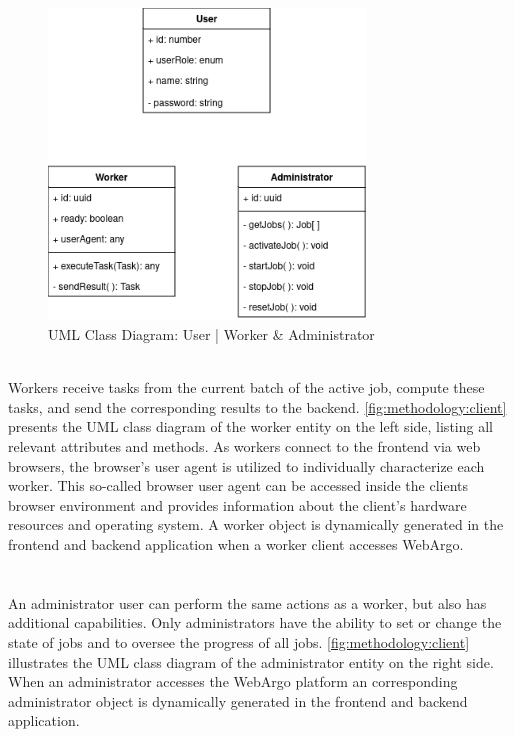 \begin{figure}[htbp]
    \centering
    \includegraphics[width=0.75\textwidth]{gfx/figures/Client.png}
    \caption{\acs{UML} Class Diagram: User | Worker \& Administrator}
    \label{fig:methodology:client}
\end{figure}
~\\
Workers receive tasks from the current batch of the active job, compute these tasks, and send the corresponding results to the backend. \autoref{fig:methodology:client} presents the \ac{UML} class diagram of the worker entity on the left side, listing all relevant attributes and methods. As workers connect to the frontend via web browsers, the browser's user agent is utilized to individually characterize each worker. This so-called browser user agent can be accessed inside the clients browser environment and provides information about the client's hardware resources and operating system. A worker object is dynamically generated in the frontend and backend application when a worker client accesses WebArgo.
\\~\\~\\
An administrator user can perform the same actions as a worker, but also has additional capabilities. Only administrators have the ability to set or change the state of jobs and to oversee the progress of all jobs. \autoref{fig:methodology:client} illustrates the \ac{UML} class diagram of the administrator entity on the right side. When an administrator accesses the WebArgo platform an corresponding administrator object is dynamically generated in the frontend and backend application.

